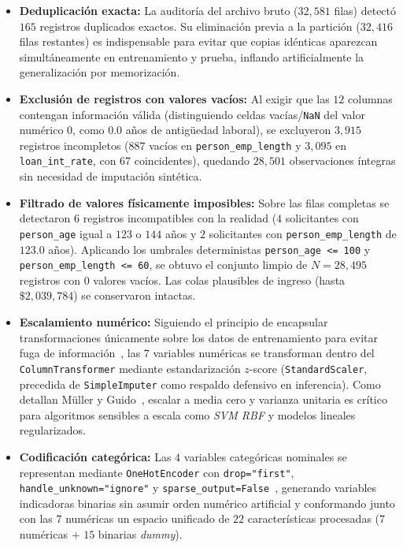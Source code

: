 \documentclass[conference]{IEEEtran}
\begin{document}
\begin{itemize}
\item \textbf{Deduplicación exacta:} La auditoría del archivo bruto ($32{,}581$ filas) detectó $165$ registros duplicados exactos. Su eliminación previa a la partición ($32{,}416$ filas restantes) es indispensable para evitar que copias idénticas aparezcan simultáneamente en entrenamiento y prueba, inflando artificialmente la generalización por memorización.
\item \textbf{Exclusión de registros con valores vacíos:} Al exigir que las $12$ columnas contengan información válida (distinguiendo celdas vacías/\texttt{NaN} del valor numérico $0$, como $0.0$ años de antigüedad laboral), se excluyeron $3{,}915$ registros incompletos ($887$ vacíos en \texttt{person\_emp\_length} y $3{,}095$ en \texttt{loan\_int\_rate}, con $67$ coincidentes), quedando $28{,}501$ observaciones íntegras sin necesidad de imputación sintética.
\item \textbf{Filtrado de valores físicamente imposibles:} Sobre las filas completas se detectaron $6$ registros incompatibles con la realidad ($4$ solicitantes con \texttt{person\_age} igual a $123$ o $144$ años y $2$ solicitantes con \texttt{person\_emp\_length} de $123.0$ años). Aplicando los umbrales deterministas \texttt{person\_age <= 100} y \texttt{person\_emp\_length <= 60}, se obtuvo el conjunto limpio de $N=28{,}495$ registros con $0$ valores vacíos. Las colas plausibles de ingreso (hasta $\$2{,}039{,}784$) se conservaron intactas.
\item \textbf{Escalamiento numérico:} Siguiendo el principio de encapsular transformaciones únicamente sobre los datos de entrenamiento para evitar fuga de información~\cite{muller2016introduction}, las $7$ variables numéricas se transforman dentro del \texttt{ColumnTransformer} mediante estandarización $z$-score (\texttt{StandardScaler}, precedida de \texttt{SimpleImputer} como respaldo defensivo en inferencia). Como detallan Müller y Guido~\cite{muller2016introduction}, escalar a media cero y varianza unitaria es crítico para algoritmos sensibles a escala como \textit{SVM RBF} y modelos lineales regularizados.
\item \textbf{Codificación categórica:} Las $4$ variables categóricas nominales se representan mediante \texttt{OneHotEncoder} con \texttt{drop="first"}, \texttt{handle\_unknown="ignore"} y \texttt{sparse\_output=False}~\cite{muller2016introduction,bolikulov2024categorical}, generando variables indicadoras binarias sin asumir orden numérico artificial y conformando junto con las $7$ numéricas un espacio unificado de $22$ características procesadas ($7$ numéricas $+$ $15$ binarias \textit{dummy}).

\end{itemize}
\end{document}
